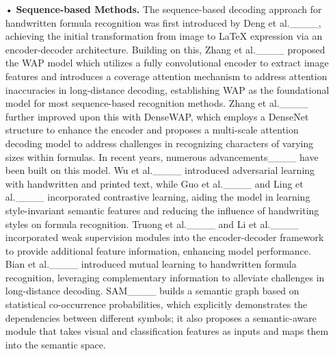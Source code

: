 \begin{itemize}
    \item [•] 
    \textbf{Sequence-based Methods.}
    The sequence-based decoding approach for handwritten formula recognition was first introduced by Deng et al.____, achieving the initial transformation from image to LaTeX expression via an encoder-decoder architecture. Building on this, Zhang et al.____ proposed the WAP model which utilizes a fully convolutional encoder to extract image features and introduces a coverage attention mechanism to address attention inaccuracies in long-distance decoding, establishing WAP as the foundational model for most sequence-based recognition methods. Zhang et al.____ further improved upon this with DenseWAP, which employs a DenseNet structure to enhance the encoder and proposes a multi-scale attention decoding model to address challenges in recognizing characters of varying sizes within formulas. In recent years, numerous advancements____ have been built on this model. Wu et al.____ introduced adversarial learning with handwritten and printed text, while Guo et al.____ and Ling et al.____ incorporated contrastive learning, aiding the model in learning style-invariant semantic features and reducing the influence of handwriting styles on formula recognition. Truong et al.____ and Li et al.____ incorporated weak supervision modules into the encoder-decoder framework to provide additional feature information, enhancing model performance. Bian et al.____ introduced mutual learning to handwritten formula recognition, leveraging complementary information to alleviate challenges in long-distance decoding. SAM____ builds a semantic graph based on statistical co-occurrence probabilities, which explicitly demonstrates the dependencies between different symbols; it also proposes a semantic-aware module that takes visual and classification features as inputs and maps them into the semantic space. 
\end{itemize}
